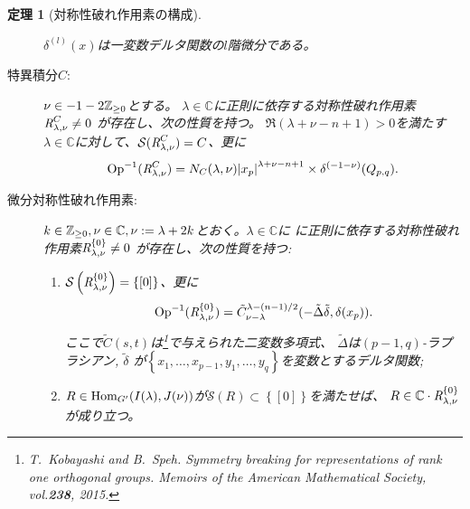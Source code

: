 \documentclass[12pt]{msjproc} %
\newcommand{\tmtextit}[1]{{\itshape{#1}}}
\newtheorem{theorem}{定理}
\newcommand{\Hom}{\mbox{\normalfont Hom}}
\newcommand{\Op}{\mbox{\normalfont Op}}
\newcommand{\OpR}{\mbox{\it R}}
\begin{document}
\begin{theorem}[対称性破れ作用素の構成]
\begin{description}
				$\delta^{(l)}(x)$は一変数デルタ関数の$l$階微分である。
			\item[特異積分$C$:]
				$\nu\in-1-2\mathbb{Z}_{\ge0}$とする。
				$\lambda\in \mathbb{C}$に正則に依存する対称性破れ作用素$\OpR^{C}_{\lambda,\nu}\neq0$
				が存在し、次の性質を持つ。
				 $\Re(\lambda+\nu-n+1)>0$を満たす$\lambda\in\mathbb{C}$に対して、$\mathcal{S}(\OpR^{C}_{\lambda,\nu})=C$、更に\vspace{-1.8ex}
					 \[\Op^{-1}(\OpR^{C}_{\lambda,\nu})={N_C
						(\lambda,\nu)}{\myabs{x_p}^{\lambda+\nu-n+1}\times\delta^{(-1-\nu)}(Q_{p,q}) }
					.\]
			\item[微分対称性破れ作用素:] 
				{$k\in\mathbb{Z}_{\ge0},\nu\in\mathbb{C},\nu:=\lambda+2k$とおく。$\lambda\in\mathbb{C}$に}
				に正則に依存する対称性破れ作用素$\OpR^{ \left\{ 0 \right\} }_{\lambda,\nu}\neq0$
				が存在し、次の性質を持つ:\vspace{-2.5ex}
				\begin{enumerate}
					\item $\mathcal{S}\left(\OpR^{ \left\{ 0 \right\} }_{\lambda,\nu}  \right)=\left\{ [0] \right\}$、更に
		\[\vspace{-2ex}\Op^{-1}(\OpR^{ \left\{0\right\}}_{\lambda,\nu})=\tilde{C}_{\nu-\lambda}^{\lambda-(n-1)/2}(-\tilde{\Delta}\tilde{\delta},\delta(x_p)).
				\]
				ここで$\tilde{C}(s,t)$は{\normalfont [KS15,(16.3)]}\footnote{\label{note1}T.~Kobayashi and B.~Speh.
  {\newblock}Symmetry breaking for representations of rank one orthogonal
  groups. {\newblock}\tmtextit{Memoirs of the American Mathematical Society},
  vol.{\bf 238}, 2015.
}で与えられた二変数多項式、
				$\tilde{\Delta}$は$(p - 1, q)$-ラプラシアン, $\tilde{\delta}$ が$\left\{ x_1,\dots,x_{p-1},y_1,\dots,y_q \right\}$を変数とするデルタ関数;
					\item
				$R\in\Hom_{G'}(I(\lambda),J(\nu))$が$\mathcal{S}(R)\subset\left\{ [0] \right\}$を満たせば、
				$R\in\mathbb{C}\cdot\OpR^{ \left\{0\right\}}_{\lambda,\nu}$が成り立つ。
				\end{enumerate}
	\end{description}
\end{theorem}
\vspace{-3ex}
\end{document}
